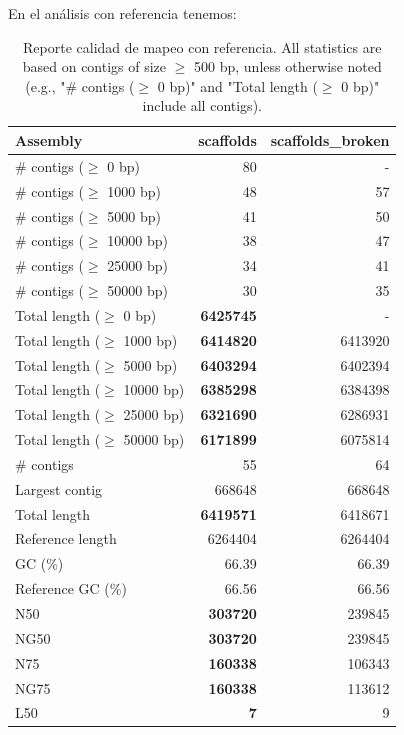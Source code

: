 \documentclass[journal, letterpaper, 11pt]{IEEEtran}
\begin{document}
En el análisis con referencia tenemos:

\begin{table}[H]
\begin{center}
\caption{Reporte calidad de mapeo con referencia. All statistics are based on contigs of size $\geq$ 500 bp, unless otherwise noted (e.g., "\# contigs ($\geq$ 0 bp)" and "Total length ($\geq$ 0 bp)" include all contigs).}
\begin{tabular}{|l*{2}{|r}|}
\hline
Assembly & scaffolds & scaffolds\_broken \\ \hline
\# contigs ($\geq$ 0 bp) & 80 & - \\ \hline
\# contigs ($\geq$ 1000 bp) & 48 & 57 \\ \hline
\# contigs ($\geq$ 5000 bp) & 41 & 50 \\ \hline
\# contigs ($\geq$ 10000 bp) & 38 & 47 \\ \hline
\# contigs ($\geq$ 25000 bp) & 34 & 41 \\ \hline
\# contigs ($\geq$ 50000 bp) & 30 & 35 \\ \hline
Total length ($\geq$ 0 bp) & {\bf 6425745} & - \\ \hline
Total length ($\geq$ 1000 bp) & {\bf 6414820} & 6413920 \\ \hline
Total length ($\geq$ 5000 bp) & {\bf 6403294} & 6402394 \\ \hline
Total length ($\geq$ 10000 bp) & {\bf 6385298} & 6384398 \\ \hline
Total length ($\geq$ 25000 bp) & {\bf 6321690} & 6286931 \\ \hline
Total length ($\geq$ 50000 bp) & {\bf 6171899} & 6075814 \\ \hline
\# contigs & 55 & 64 \\ \hline
Largest contig & 668648 & 668648 \\ \hline
Total length & {\bf 6419571} & 6418671 \\ \hline
Reference length & 6264404 & 6264404 \\ \hline
GC (\%) & 66.39 & 66.39 \\ \hline
Reference GC (\%) & 66.56 & 66.56 \\ \hline
N50 & {\bf 303720} & 239845 \\ \hline
NG50 & {\bf 303720} & 239845 \\ \hline
N75 & {\bf 160338} & 106343 \\ \hline
NG75 & {\bf 160338} & 113612 \\ \hline
L50 & {\bf 7} & 9 \\ \hline

\end{tabular}
\end{center}
\end{table}
\end{document}
